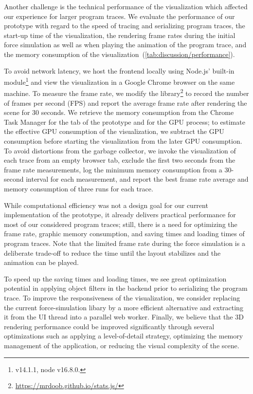 Another challenge is the technical performance of the visualization which affected our experience for larger program traces.
We evaluate the performance of our prototype with regard to the speed of tracing and serializing program traces, the start-up time of the visualization, the rendering frame rates during the initial force simulation as well as when playing the animation of the program trace, and the memory consumption of the visualization~(\cref{tab:discussion/performance}).

To avoid network latency, we host the \tfd{} frontend locally using Node.js' built-in  module\footnote{ v14.1.1, node v16.8.0.} and view the visualization in a Google Chrome browser on the same machine.
To measure the frame rate, we modify the  library\footnote{\url{https://mrdoob.github.io/stats.js/}} to record the number of frames per second (FPS) and report the average frame rate after rendering the scene for 30 seconds.
We retrieve the memory consumption from the Chrome Task Manager for the tab of the \tfd{} prototype and for the GPU process; to estimate the effective GPU consumption of the visualization, we subtract the GPU consumption before starting the visualization from the later GPU consumption.
To avoid distortions from the garbage collector, we invoke the visualization of each trace from an empty browser tab, exclude the first two seconds from the frame rate measurements, log the minimum memory consumption from a 30-second interval for each measurement, and report the best frame rate average and memory consumption of three runs for each trace.

While computational efficiency was not a design goal for our current implementation of the \tfd{} prototype, it already delivers practical performance for most of our considered program traces; still, there is a need for optimizing the frame rate, graphic memory consumption, and saving times and loading times of program traces.
Note that the limited frame rate during the force simulation is a deliberate trade-off to reduce the time until the layout stabilizes and the animation can be played.

To speed up the saving times and loading times, we see great optimization potential in applying object filters in the backend prior to serializing the program trace.
To improve the responsiveness of the visualization, we consider replacing the current force-simulation libary  by a more efficient alternative and extracting it from the UI thread into a parallel web worker.
Finally, we believe that the 3D rendering performance could be improved significantly through several optimizations such as applying a level-of-detail strategy, optimizing the memory management of the application, or reducing the visual complexity of the scene.
